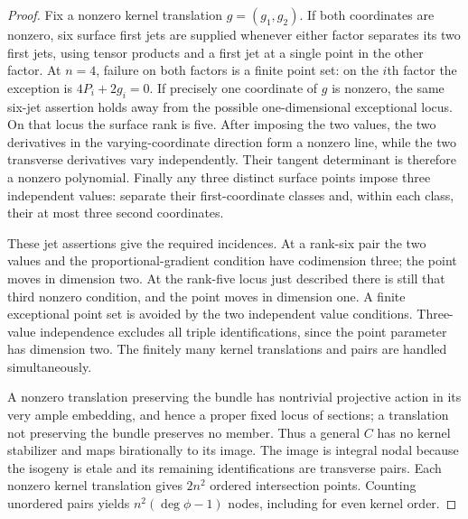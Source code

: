 \begin{proof}
Fix a nonzero kernel translation $g=(g_1,g_2)$.  If both coordinates
are nonzero, six surface first jets are supplied whenever either
factor separates its two first jets, using tensor products and a
first jet at a single point in the other factor.  At $n=4$, failure
on both factors is a finite point set: on the $i$th factor the
exception is $4P_i+2g_i=0$.  If precisely one coordinate of $g$
is nonzero, the same six-jet assertion holds away from the possible
one-dimensional exceptional locus.  On that locus the surface rank
is five.  After imposing the two values, the two derivatives in the
varying-coordinate direction form a nonzero line, while the two
transverse derivatives vary independently.  Their tangent determinant
is therefore a nonzero polynomial.  Finally any three distinct
surface points impose three independent values: separate their
first-coordinate classes and, within each class, their at most
three second coordinates.

These jet assertions give the required incidences.  At a rank-six
pair the two values and the proportional-gradient condition have
codimension three; the point moves in dimension two.  At the
rank-five locus just described there is still that third nonzero
condition, and the point moves in dimension one.  A finite exceptional
point set is avoided by the two independent value conditions.
Three-value independence excludes all triple identifications, since
the point parameter has dimension two.  The finitely many kernel
translations and pairs are handled simultaneously.

A nonzero translation preserving the bundle has nontrivial projective
action in its very ample embedding, and hence a proper fixed locus
of sections; a translation not preserving the bundle preserves no
member.  Thus a general $C$ has no kernel stabilizer and maps
birationally to its image.  The image is integral nodal because the
isogeny is etale and its remaining identifications are transverse
pairs.  Each nonzero kernel translation gives $2n^2$ ordered
intersection points.  Counting unordered pairs yields
$n^2(\deg\phi-1)$ nodes, including for even kernel order.
\end{proof}


